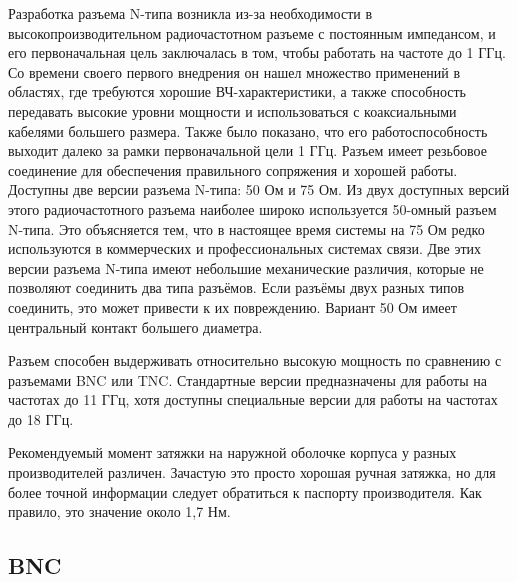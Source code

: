 \documentclass[%
	11pt,
	a4paper,
	utf8,
		]{article}
\begin{document}
Разработка разъема N-типа возникла из-за необходимости в высокопроизводительном радиочастотном разъеме с постоянным импедансом, и его первоначальная цель заключалась в том, чтобы работать на частоте до 1 ГГц. Со времени своего первого внедрения он нашел множество применений в областях, где требуются хорошие ВЧ-характеристики, а также способность передавать высокие уровни мощности и использоваться с коаксиальными кабелями большего размера. Также было показано, что его работоспособность выходит далеко за рамки первоначальной цели 1 ГГц. Разъем имеет резьбовое соединение для обеспечения правильного сопряжения и хорошей работы. Доступны две версии разъема N-типа: 50 Ом и 75 Ом.
Из двух доступных версий этого радиочастотного разъема наиболее широко используется 50-омный разъем N-типа. Это объясняется тем, что в настоящее время системы на 75 Ом редко используются в коммерческих и профессиональных системах связи. Две этих версии разъема N-типа имеют небольшие механические различия, которые не позволяют соединить два типа разъёмов. Если разъёмы двух разных типов соединить, это может привести к их повреждению. Вариант 50 Ом имеет центральный контакт большего диаметра.

Разъем способен выдерживать относительно высокую мощность по сравнению с разъемами BNC или TNC. Стандартные версии предназначены для работы на частотах до 11 ГГц, хотя доступны специальные версии для работы на частотах до 18 ГГц.

Рекомендуемый момент затяжки на наружной оболочке корпуса у разных производителей различен. Зачастую это просто хорошая ручная затяжка, но для более точной информации следует обратиться к паспорту производителя. Как правило, это значение около 1,7 Нм.


\subsection{BNC}
\end{document}
